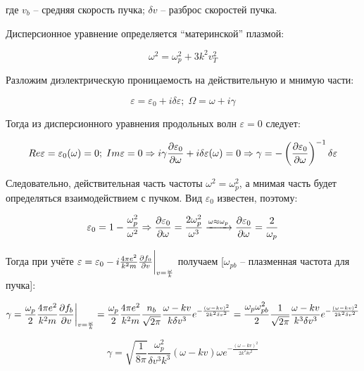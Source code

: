 \documentclass[10pt, a4paper]{article}
\begin{document}
где $v_b$ -- средняя скорость пучка; $\delta v$ -- разброс скоростей пучка.

Дисперсионное уравнение определяется ``материнской'' плазмой:

\begin{equation*}
	\omega^2 = \omega_p^2 + 3k^2v_T^2
\end{equation*}

Разложим диэлектрическую проницаемость на действительную и мнимую части:

\begin{equation*}
	\varepsilon = \varepsilon_0 + i\delta\varepsilon;\;\Omega = \omega+i\gamma
\end{equation*}

Тогда из дисперсионного уравнения продольных волн $\varepsilon = 0$ следует:

\begin{equation*}
	Re\varepsilon = \varepsilon_0(\omega) = 0;\;Im\varepsilon = 0 \Rightarrow i\gamma\pdv{\varepsilon_0}{\omega} + i\delta\varepsilon(\omega) = 0 \Rightarrow \gamma = -\left(\pdv{\varepsilon_0}{\omega}\right)^{-1}\delta\varepsilon
\end{equation*}

Следовательно, действительная часть частоты $\omega^2 = \omega_p^2$, а мнимая часть будет определяться взаимодействием с пучком. Вид $\varepsilon_0$ известен, поэтому:

\begin{equation*}
	\varepsilon_0 = 1 - \frac{\omega_p^2}{\omega^2} \Rightarrow \pdv{\varepsilon_0}{\omega} = \frac{2\omega_p^2}{\omega^3} \xrightarrow{\omega\approx\omega_p} \pdv{\varepsilon_0}{\omega} = \frac{2}{\omega_p}
\end{equation*}

Тогда при учёте $\varepsilon = \varepsilon_0 - i\frac{4\pi e^2}{k^2 m}\pdv{f_0}{v}\bigg|_{v=\frac{\omega}{k}}$ получаем [$\omega_{pb}$ -- плазменная частота для пучка]:

\begin{equation*}
	\gamma = \frac{\omega_p}{2}\frac{4\pi e^2}{k^2 m}\pdv{f_b}{v}\bigg|_{v=\frac{\omega}{k}} = \frac{\omega_p}{2}\frac{4\pi e^2}{k^2 m}\frac{n_b}{\sqrt{2\pi}}\frac{\omega-kv}{k\delta v^3}e^{-\frac{(\omega-kv)^2}{2k^2\delta v^2}} = \frac{\omega_p\omega_{pb}^2}{2}\frac{1}{\sqrt{2\pi}}\frac{\omega-kv}{k^3\delta v^3}e^{-\frac{(\omega-kv)^2}{2k^2\delta v^2}}
\end{equation*}

\begin{equation*}
	\gamma = \sqrt{\frac{1}{8\pi}}\frac{\omega_p^2}{\delta v^3k^3}(\omega-kv)\omega e^{-\frac{(\omega-kv)^2}{2k^2\delta v^2}}
\end{equation*}
\end{document}
